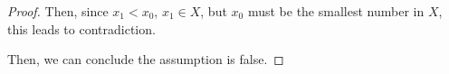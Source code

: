 \documentclass[12pt]{article}
\begin{document}
\begin{itemize}
\begin{proof}
    \bigskip

    Then, since $x_1 < x_0$, $x_1 \in X$, but $x_0$ must be
    the smallest number in $X$, this leads to contradiction.

    \bigskip

    Then, we can conclude the assumption is false.

    \end{proof}

\end{itemize}















\end{document}
